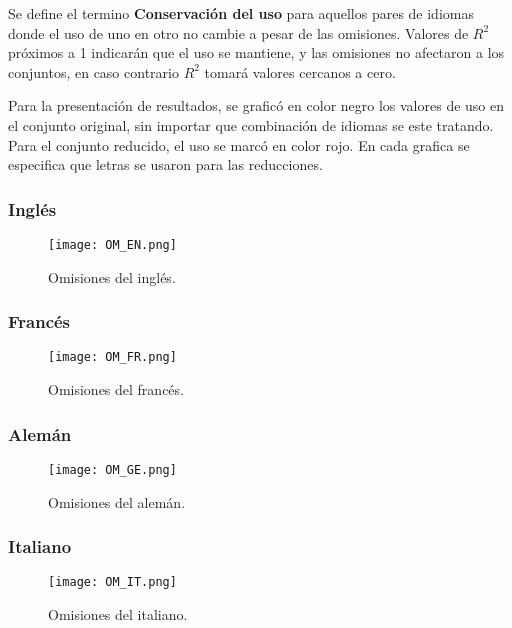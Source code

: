Se define el termino \textbf{Conservación del uso} para aquellos pares de idiomas donde el uso de uno en otro no cambie a pesar de las omisiones. Valores de $R^{2}$  próximos a 1 indicarán que el uso se mantiene, y las omisiones no afectaron a los conjuntos, en caso contrario $R^{2}$ tomará valores cercanos a cero.  

Para la presentación de resultados, se graficó en color negro los valores de uso en el conjunto original, sin importar que combinación de idiomas se este tratando.  Para el conjunto reducido, el uso se marcó en color rojo.  En cada grafica se especifica que letras se usaron para las reducciones. 

\newpage

\subsubsection*{Inglés}

\begin{figure}[h!]
	\centering
	\texttt{[image: OM\_EN.png]}
	\label{fig.OM_EN}
	\caption{Omisiones del inglés.}
\end{figure}


\subsubsection*{Francés}

\begin{figure}[h!]
	\centering
	\texttt{[image: OM\_FR.png]}
	\label{fig.OM_FR}
	\caption{Omisiones del francés.}
\end{figure}


\newpage
\subsubsection*{Alemán}

\begin{figure}[h!]
	\centering
	\texttt{[image: OM\_GE.png]}
	\label{fig.OM_GE}
	\caption{Omisiones del alemán.}
\end{figure}


\subsubsection*{Italiano}

\begin{figure}[h!]
	\centering
	\texttt{[image: OM\_IT.png]}
	\label{fig.OM_IT}
	\caption{Omisiones del italiano.}
\end{figure}


